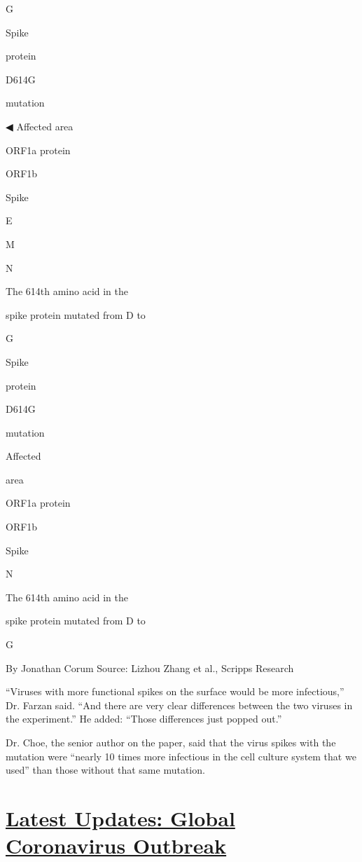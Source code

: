 G

Spike

protein

D614G

mutation

◀ Affected area

ORF1a protein

ORF1b

Spike

E

M

N

The 614th amino acid in the

spike protein mutated from D to

G

Spike

protein

D614G

mutation

Affected

area

ORF1a protein

ORF1b

Spike

N

The 614th amino acid in the

spike protein mutated from D to

G

By Jonathan Corum \textbar{} Source: Lizhou Zhang et al., Scripps
Research

``Viruses with more functional spikes on the surface would be more
infectious,'' Dr. Farzan said. ``And there are very clear differences
between the two viruses in the experiment.'' He added: ``Those
differences just popped out.''

Dr. Choe, the senior author on the paper, said that the virus spikes
with the mutation were ``nearly 10 times more infectious in the cell
culture system that we used'' than those without that same mutation.

\hypertarget{latest-updates-global-coronavirus-outbreak}{%
\section{\texorpdfstring{\href{https://www.nytimes.com/2020/08/01/world/coronavirus-covid-19.html?action=click\&pgtype=Article\&state=default\&region=MAIN_CONTENT_1\&context=storylines_live_updates}{Latest
Updates: Global Coronavirus
Outbreak}}{Latest Updates: Global Coronavirus Outbreak}}\label{latest-updates-global-coronavirus-outbreak}}

